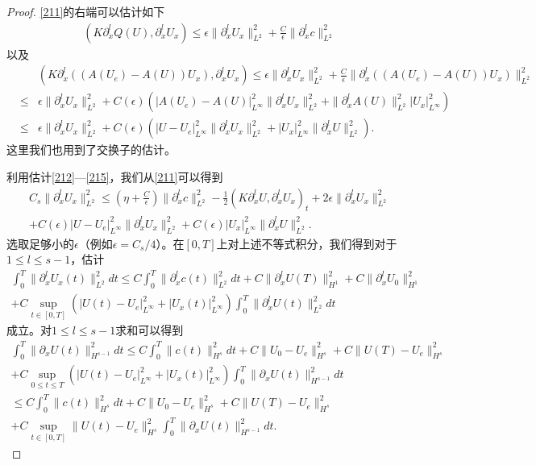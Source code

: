 \begin{proof}
\eqref{211}的右端可以估计如下
\begin{eqnarray}\label{214}
  (K \partial^l_x Q(U),\partial^l_x U_x) \le \epsilon \|\partial^l_x U_x\|_{L^2}^2 + \frac{C}{\epsilon} \|\partial^l_x c\|_{L^2}^2
\end{eqnarray}
以及
\begin{eqnarray}\label{215}
  && (K\partial^l_x ((A(U_e)-A(U))U_x),\partial^l_x U_x) \le \epsilon\|\partial^l_x U_x\|_{L^2}^2 + \frac{C}{\epsilon} \|\partial^l_x( (A(U_e)-A(U))U_x)\|_{L^2}^2 \nonumber \\
  &\le& \epsilon \|\partial^l_x U_x \|_{L^2}^2 + C(\epsilon)( |A(U_e)-A(U )|_{L^\infty}^2 \|\partial^l_x U_x\|^2_{L^2}+\|\partial^l_x A(U)\|_{L^2}^2|U_x|_{L^\infty}^2) \nonumber \\
  &\le& \epsilon \|\partial^l_x U_x\|_{L^2}^2 + C(\epsilon) (|U-U_e|_{L^\infty}^2 \|\partial^l_x U_x\|_{L^2}^2 + |U_x|_{L^\infty}^2 \|\partial^l_x U\|_{L^2}^2).
\end{eqnarray}
这里我们也用到了交换子的估计。

利用估计\eqref{212}—\eqref{215}，我们从\eqref{211}可以得到
\begin{multline*}
  C_s \|\partial^l_x U_x\|^2_{L^2} \le (\eta+\frac{C}{\epsilon}) \|\partial^l_x c\|_{L^2}^2-\frac{1}{2} (K \partial^l_x U,\partial^l_x U_x)_t  + 2\epsilon \|\partial^l_x U_x\|^2_{L^2} \\
  +C(\epsilon) |U-U_e|_{L^\infty}^2 \|\partial^l_x U_x\|_{L^2}^2 + C(\epsilon) |U_x|_{L^\infty}^2 \|\partial^l_x U\|_{L^2}^2.
\end{multline*}
选取足够小的$\epsilon$（例如$\epsilon = C_s/4$）。在$[0,T]$上对上述不等式积分，我们得到对于$1\le l \le s-1$，估计
\begin{multline*}
  \int_0^T \|\partial^l_x U_x(t)\|^2_{L^2} dt \le C \int_0^T \|\partial^l_x c(t)\|^2_{L^2} dt
  +C\|\partial^l_x U(T)\|_{H^1}^2 + C\|\partial^l_x U_0\|_{H^1}^2 \\
  + C \sup_{t\in [0,T]} (|U(t)-U_e|_{L^\infty}^2 + |U_x(t)|_{L^\infty}^2) \int_0^T \|\partial^l_x U(t)\|_{L^2}^2 dt
\end{multline*}
成立。对$1 \le l \le s-1$求和可以得到
\begin{multline}\label{216}
  \int_0^T \|\partial_x U(t)\|^2_{H^{s-1}} dt \le C \int_0^T \|c(t)\|^2_{H^s} dt + C\|U_0-U_e\|^2_{H^s} + C\|U(T)-U_e\|^2_{H^s} \\+C \sup_{0 \le t \le T}(|U(t)-U_e|_{L^\infty}^2 + |U_x(t)|_{L^\infty}^2) \int_0^T \|\partial_x U(t)\|_{H^{s-1}}^2 dt \\
  \le C \int_0^T \|c(t)\|_{H^s}^2 dt + C \|U_0-U_e\|_{H^s}^2 + C\|U(T) -U_e\|_{H^s}^2  \\ + C \sup_{t \in [0,T] }\|U(t)-U_e\|_{H^s}^2 \int_0^T \|\partial_x U(t)\|_{H^{s-1}}^2 dt.
\end{multline}


\end{proof}
